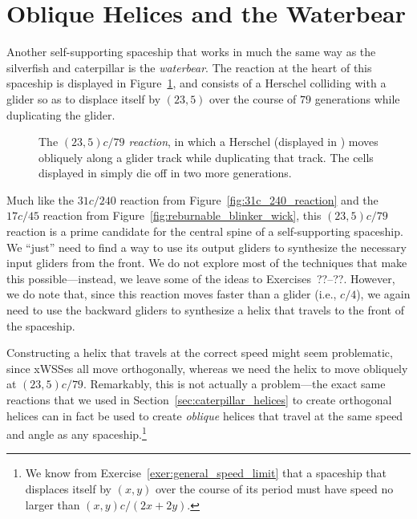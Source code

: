 \section{Oblique Helices and the Waterbear}\label{sec:waterbear}

Another self-supporting spaceship that works in much the same way as the silverfish and caterpillar is the \emph{waterbear}. The reaction at the heart of this spaceship is displayed in Figure~\ref{fig:23_5c_79_reaction}, and consists of a Herschel colliding with a glider so as to displace itself by $(23,5)$ over the course of $79$ generations while duplicating the glider.

\begin{figure}[!htb]
	\centering
	\caption{The \emph{$(23,5)c/79$ reaction}, in which a Herschel (displayed in ) moves obliquely along a glider track while duplicating that track. The cells displayed in  simply die off in two more generations.}\label{fig:23_5c_79_reaction}
\end{figure}

Much like the $31c/240$ reaction from Figure~\ref{fig:31c_240_reaction} and the $17c/45$ reaction from Figure~\ref{fig:reburnable_blinker_wick}, this $(23,5)c/79$ reaction is a prime candidate for the central spine of a self-supporting spaceship. We ``just'' need to find a way to use its output gliders to synthesize the necessary input gliders from the front. We do not explore most of the techniques that make this possible---instead, we leave some of the ideas to Exercises~??--??. However, we do note that, since this reaction moves faster than a glider (i.e., $c/4$), we again need to use the backward gliders to synthesize a helix that travels to the front of the spaceship.

Constructing a helix that travels at the correct speed might seem problematic, since xWSSes all move orthogonally, whereas we need the helix to move obliquely at $(23,5)c/79$. Remarkably, this is not actually a problem---the exact same reactions that we used in Section~\ref{sec:caterpillar_helices} to create orthogonal helices can in fact be used to create \emph{oblique} helices that travel at the same speed and angle as any spaceship.\footnote{We know from Exercise~\ref{exer:general_speed_limit} that a spaceship that displaces itself by $(x,y)$ over the course of its period must have speed no larger than $(x,y)c/(2x+2y)$.}

